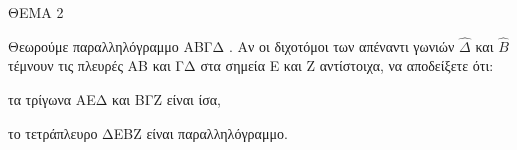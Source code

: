 
ΘΕΜΑ 2

Θεωρούμε παραλληλόγραμμο ΑΒΓΔ . Αν οι διχοτόμοι των απέναντι γωνιών $\widehat{\Delta}$ και $\widehat{Β}$ τέμνουν τις πλευρές ΑΒ και ΓΔ στα σημεία Ε και Ζ αντίστοιχα, να αποδείξετε ότι:

\begin{alist}
\item τα τρίγωνα ΑΕΔ και ΒΓΖ είναι ίσα, 

\item το τετράπλευρο ΔΕΒΖ είναι παραλληλόγραμμο. 
\end{alist}
